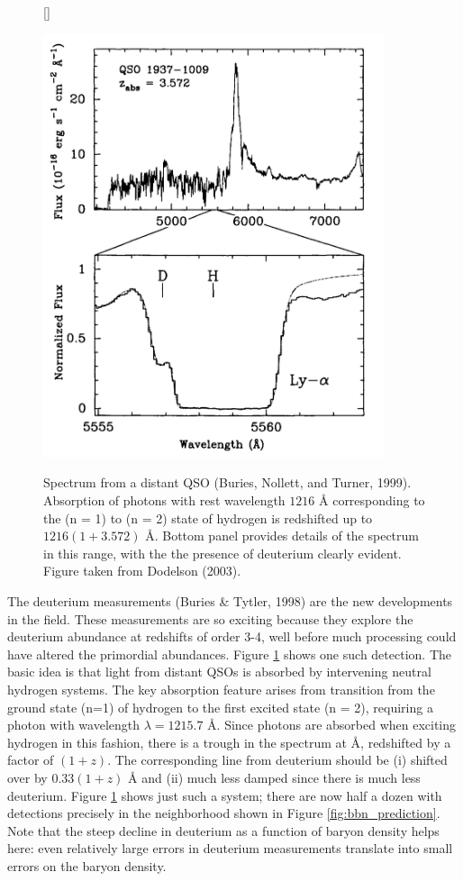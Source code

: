 \documentclass[a4paper,11pt]{article}
\begin{document}
\begin{figure}[h]
    [\FBwidth]
    {\caption{\footnotesize{Spectrum from a distant QSO (Buries, Nollett, and Turner, 1999). Absorption of photons with rest wavelength $1216$ {\AA} corresponding to the (n = 1) to (n = 2) state of hydrogen is redshifted up to $1216(1+3.572)$ \AA. Bottom panel provides details of the spectrum in this range, with the the presence of deuterium clearly evident. Figure taken from Dodelson (2003).}}
    \label{fig:deuterium}}
    {\includegraphics[width=10cm]{figures/deuterium.png}}
\end{figure}

{\noindent}The deuterium measurements (Buries \& Tytler, 1998) are the new developments in the field. These measurements are so exciting because they explore the deuterium abundance at redshifts of order 3-4, well before much processing could have altered the primordial abundances. Figure \ref{fig:deuterium} shows one such detection. The basic idea is that light from distant QSOs is absorbed by intervening neutral hydrogen systems. The key absorption feature arises from transition from the ground state (n=1) of hydrogen to the first excited state (n = 2), requiring a photon with wavelength $\lambda = 1215.7$ \AA. Since photons are absorbed when exciting hydrogen in this fashion, there is a trough in the spectrum at {\AA}, redshifted by a factor of $(1+z)$. The corresponding line from deuterium should be (i) shifted over by $0.33(1+z)$ {\AA} and (ii) much less damped since there is much less deuterium. Figure \ref{fig:deuterium} shows just such a system; there are now half a dozen with detections precisely in the neighborhood shown in Figure \ref{fig:bbn_prediction}. Note that the steep decline in deuterium as a function of baryon density helps here: even relatively large errors in deuterium measurements translate into small errors on the baryon density.
\end{document}
